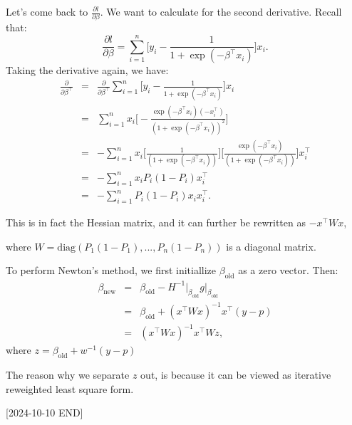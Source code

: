 \documentclass{article}
\theoremstyle{MyNonumberplain}
\theoremstyle{break}
\newcommand{\T}{^\intercal}
\newcommand{\inv}{^{-1}}
\newcommand{\pd}[2]{\frac{\partial {#1}}{\partial {#2}}}
\theoremstyle{break}
\theoremstyle{break}
\theoremstyle{break}
\begin{document}
Let's come back to $\pd{l}{\beta}$. We want to calculate for the second derivative. Recall that:
$$
\pd{l}{\beta} =\sum_{i=1}^n \Biggl[y_i-\frac{1}{1+\exp(-\beta\T x_i)}\Biggr]x_i.
$$
Taking the derivative again, we have:
\begin{eqnarray*}
    \pd{}{\beta\T} &=& \pd{}{\beta\T}\sum_{i=1}^n \Biggl[y_i-\frac{1}{1+\exp(-\beta\T x_i)}\Biggr]x_i\\
                   &=& \sum_{i=1}^n x_i\Biggl[-\frac{\exp(-\beta\T x_i)(-x_i\T)}{(1+\exp(-\beta\T x_i))^2}\Biggr]\\
                   &=& -\sum_{i=1}^n x_i \Biggl[\frac{1}{(1+\exp(-\beta\T x_i))}\Biggr]\Biggl[\frac{\exp(-\beta\T x_i)}{(1+\exp(-\beta\T x_i))}\Biggr]x_i\T\\
                   &=& -\sum_{i=1}^n x_i P_i (1-P_i) x_i\T\\
                   &=& -\sum_{i=1}^n P_i (1-P_i) x_i x_i\T.
\end{eqnarray*}

This is in fact the Hessian matrix, and it can further be rewritten as $-x\T Wx$,

where $W=\text{diag}(P_1 (1-P_1),...,P_n (1-P_n))$ is a diagonal matrix.

To perform Newton's method, we first initiallize $\beta_{\text{old}}$ as a zero vector. Then: 
\begin{eqnarray*}
    \beta_{\text{new}} &=& \beta_{\text{old}} - H\inv\vert_{\beta_{\text{old}}} g\vert_{\beta_{\text{old}}}\\
                       &=& \beta_{\text{old}} + (x\T Wx)\inv x\T(y-p)\\
                       &=& (x\T Wx)\inv x\T Wz,
\end{eqnarray*}
where $z=\beta_{\text{old}}+w\inv(y-p)$

The reason why we separate $z$ out, is because it can be viewed as iterative reweighted least square form.

[2024-10-10 END]
\end{document}
